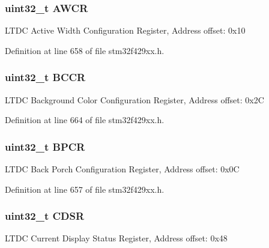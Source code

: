 \subsubsection[{\texorpdfstring{A\+W\+CR}{AWCR}}]{ uint32\+\_\+t A\+W\+CR}\hypertarget{struct_l_t_d_c___type_def_a2277d6936f88a3bbb0b7fd1481b2c2c5}{}\label{struct_l_t_d_c___type_def_a2277d6936f88a3bbb0b7fd1481b2c2c5}
L\+T\+DC Active Width Configuration Register, Address offset\+: 0x10 

Definition at line 658 of file stm32f429xx.\+h.

\subsubsection[{\texorpdfstring{B\+C\+CR}{BCCR}}]{ uint32\+\_\+t B\+C\+CR}\hypertarget{struct_l_t_d_c___type_def_a7a7c554d0c2d78d8b044a699602e37e1}{}\label{struct_l_t_d_c___type_def_a7a7c554d0c2d78d8b044a699602e37e1}
L\+T\+DC Background Color Configuration Register, Address offset\+: 0x2C 

Definition at line 664 of file stm32f429xx.\+h.

\subsubsection[{\texorpdfstring{B\+P\+CR}{BPCR}}]{ uint32\+\_\+t B\+P\+CR}\hypertarget{struct_l_t_d_c___type_def_ab954c16d70935a24b62aad461a664878}{}\label{struct_l_t_d_c___type_def_ab954c16d70935a24b62aad461a664878}
L\+T\+DC Back Porch Configuration Register, Address offset\+: 0x0C 

Definition at line 657 of file stm32f429xx.\+h.

\subsubsection[{\texorpdfstring{C\+D\+SR}{CDSR}}]{ uint32\+\_\+t C\+D\+SR}\hypertarget{struct_l_t_d_c___type_def_a5e235993884b3f8d42db5f51d9bd1942}{}\label{struct_l_t_d_c___type_def_a5e235993884b3f8d42db5f51d9bd1942}
L\+T\+DC Current Display Status Register, Address offset\+: 0x48 


